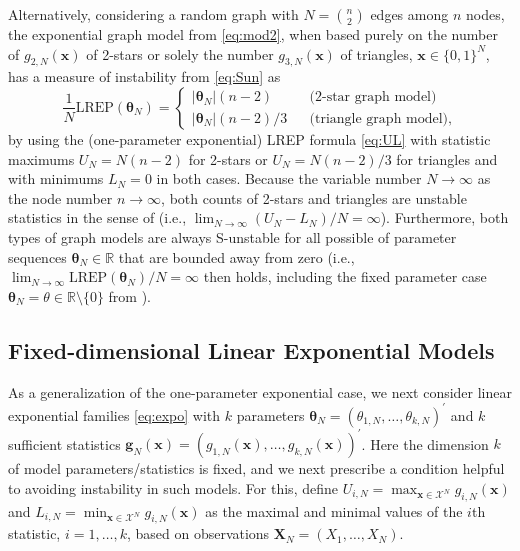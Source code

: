 \documentclass[numbib]{imamat}
\theoremstyle{theorem}
\theoremstyle{lemma}
\theoremstyle{example}
\theoremstyle{corollary}
\theoremstyle{definition}
\theoremstyle{remark}
\theoremstyle{approximation}
\theoremstyle{scheme}
\newcommand{\REP}{\mathrm{LREP}}
\begin{document}
Alternatively, considering a random graph with \(N={n \choose 2}\) edges among \(n\) nodes, the exponential graph model from \eqref{eq:mod2}, when based purely on the number of \(g_{2,N}(\boldsymbol x)\) of 2-stars or solely the number \(g_{3,N}(\boldsymbol x)\) of triangles, \(\boldsymbol x\in\{0,1\}^N\), has a measure of instability from \eqref{eq:Sun} as
\[
\frac{1}{N}\REP(\boldsymbol \theta_N )  = \left\{ \begin{array}{lcl} |\boldsymbol \theta_N| (n-2) && \text{(2-star graph model)}\\
|\boldsymbol \theta_N|(n-2)/3 &&\text{(triangle graph model)},\end{array}\right.
\]
by using the (one-parameter exponential) LREP formula \eqref{eq:UL} with statistic maximums \(U_N= N(n-2)\) for 2-stars or \(U_N= N(n-2)/3\) for triangles and with minimums \(L_N=0\) in both cases. Because the variable number \(N\to \infty\) as the node number \(n\to \infty\), both counts of 2-stars and triangles are unstable statistics in the sense of \citet{schweinberger2011instability} (i.e., \(\lim_{N\to \infty} (U_N-L_N)/N=\infty\)). Furthermore, both types of graph models are always S-unstable for all possible of parameter sequences \(\boldsymbol \theta_N \in\mathbb{R}\) that are bounded away from zero (i.e., \(\lim_{N\to \infty}\REP(\boldsymbol \theta_N )/N=\infty\) then holds, including the fixed parameter case \(\boldsymbol \theta_N=\theta\in\mathbb{R}\setminus \{0\}\) from \citet{schweinberger2011instability}).

\hypertarget{fixed-dim-exp}{%
\subsection{Fixed-dimensional Linear Exponential Models}\label{fixed-dim-exp}}

As a generalization of the one-parameter exponential case, we next consider linear exponential families \eqref{eq:expo} with \(k\) parameters \(\boldsymbol \theta_N = (\theta_{1,N},\ldots,\theta_{k,N})^\prime\) and \(k\) sufficient statistics \(\boldsymbol g_N(\boldsymbol x) = (g_{1,N}(\boldsymbol x),\ldots, g_{k,N}(\boldsymbol x))^\prime\). Here the dimension \(k\) of model parameters/statistics is fixed, and we next prescribe a condition helpful to avoiding instability in such models. For this, define \(U_{i,N}=\max_{\boldsymbol x \in\mathcal{X}^N} g_{i,N}(\boldsymbol x)\) and \(L_{i,N}=\min_{\boldsymbol x \in\mathcal{X}^N} g_{i,N}(\boldsymbol x)\) as the maximal and minimal values of the \(i\)th statistic, \(i=1,\ldots,k\), based on observations \(\boldsymbol X_N=(X_1,\ldots,X_N)\).
\end{document}
